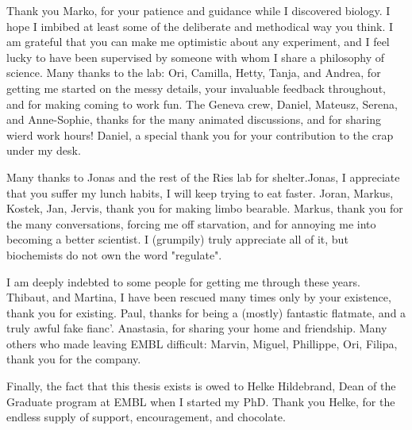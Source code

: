 \documentclass[
12pt, %
ngerman,
english, %
onehalfspacing,
hidelinks,
headsepline, %
]{MastersDoctoralThesis} %
\begin{document}
\begin{acknowledgements}
\bigskip
Thank you Marko, for your patience and guidance while I discovered biology. I hope I imbibed at least some of the deliberate and methodical way you think. I am grateful that you can make me optimistic about any experiment, and I feel lucky to have been supervised by someone with whom I share a philosophy of science. Many thanks to the lab: Ori, Camilla, Hetty, Tanja, and Andrea, for getting me started on the messy details, your invaluable feedback throughout, and for making coming to work fun. The Geneva crew, Daniel, Mateusz, Serena, and Anne-Sophie, thanks for the many animated discussions, and for sharing wierd work hours! Daniel, a special thank you for your contribution to the crap under my desk.

Many thanks to Jonas and the rest of the Ries lab for shelter.Jonas, I appreciate that you suffer my lunch habits, I will keep trying to eat faster. Joran, Markus, Kostek, Jan, Jervis, thank you for making limbo bearable. Markus, thank you for the many conversations, forcing me off starvation, and for annoying me into becoming a better scientist. I (grumpily) truly appreciate all of it, but biochemists do not own the word "regulate". 

 I am deeply indebted to some people for getting me through these years. Thibaut, and Martina, I have been rescued many times only by your existence, thank you for existing. Paul, thanks for being a (mostly) fantastic flatmate, and a truly awful fake fianc\e'.  Anastasia, for sharing your home and friendship. Many others who made leaving EMBL difficult: Marvin, Miguel, Phillippe, Ori, Filipa, thank you for the company. 

Finally, the fact that this thesis exists is owed to Helke Hildebrand, Dean of the Graduate program at EMBL when I started my PhD. Thank you Helke, for the endless supply of support, encouragement, and chocolate. 




\vspace{\baselineskip}




\end{acknowledgements}
\end{document}
